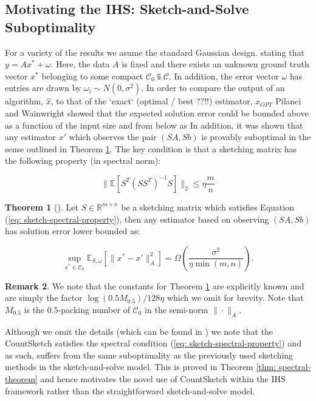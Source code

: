 \documentclass[twoside]{article}
\newcommand{\R}{\mathbb{R}}
\newcommand{\E}{\mathbb{E}}
\theoremstyle{definition}\newtheorem{thm}{Theorem}[section]
\theoremstyle{definition}\newtheorem{mydef}[thm]{Definition}
\theoremstyle{definition}\newtheorem{rem}[thm]{Remark}
\theoremstyle{definition}\newtheorem{prop}[thm]{Proposition}
\theoremstyle{definition}\newtheorem{example}[thm]{Example}
\theoremstyle{definition}\newtheorem{claim}[thm]{Claim}
\theoremstyle{definition}\newtheorem{Qu}[thm]{Question}
\theoremstyle{definition}\newtheorem{Lemma}[thm]{Lemma}
\theoremstyle{definition}\newtheorem{Cor}[thm]{Corollary}
\theoremstyle{definition}\newtheorem{Fact}[]{Fact}
\begin{document}
\subsection{Motivating the IHS: Sketch-and-Solve Suboptimality}

For a variety of the results we asume the standard Gaussian design.
stating that $y = A x^* + \omega$.
Here, the data $A$ is fixed and there exists an unknown ground truth
vector $x^*$ belonging to some compact $\mathcal{C}_0 \subseteqq \mathcal{C}$.
In addition, the error vector $\omega$ has entries are drawn
by $\omega_i \sim N(0, \sigma^2)$.
In order to compare the output of an algorithm, $\hat{x}$, to that of the
`exact` (optimal / best ??!!) estimator, $x_{OPT}$ Pilanci and Wainwright
showed that the expected solution error could be bounded above as a function
of the input size and from below as
In addition, it was shown that any estimator $x'$ which observes the pair
$(SA, Sb)$ is provably suboptimal in the sense outlined in Theorem
\ref{thm: clsq-lower-bound}.
The key condition is that a sketching matrix has the following
property (in spectral norm):

\begin{equation} \label{eq: sketch-spectral-property}
  \| \E \left[ S^T (S S^T)^{-1} S \right] \|_2 \le \eta \frac{m}{n}
\end{equation}

\begin{thm}[\cite{pilanci2016iterative}] \label{thm: clsq-lower-bound}
  Let $S \in \R^{m \times n}$ be a sketching matrix which satisfies
  Equation (\ref{eq: sketch-spectral-property}), then any estimator
  based on observing $(SA, Sb)$ has solution error lower bounded as:

  \begin{equation}
    \sup_{x^* \in \mathcal{C}_0} \E_{S,\omega} [\|x^* - x'\|_A^2 ]
     = \Omega \left(
    \frac{\sigma^2}{\eta \min(m,n)} \right).
  \end{equation}
\end{thm}

\begin{rem}
  We note that the constants for Theorem \ref{thm: clsq-lower-bound} are
  explicitly known and are simply the factor $\log(0.5 M_{0.5})/128\eta$
  which we omit for brevity.
  Note that $M_{0.5}$ is the $0.5$-packing number of $\mathcal{C}_0$ in
  the semi-norm $\| \cdot \|_A$.
\end{rem}
Although we omit the details (which can be found in \cite{pilanci2016iterative})
we note that the CountSketch satisfies the spectral condition (\ref{eq: sketch-spectral-property})
and as such, suffers from the same suboptimality as the previously used
sketching methods in the sketch-and-solve model.
This is proved in Theorem \ref{thm: spectral-theorem} and hence motivates the
novel use of CountSketch within the IHS framework rather than the straightforward
sketch-and-solve model.
\end{document}
